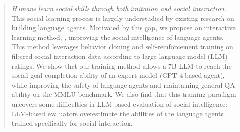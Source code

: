 \begin{abstract}
\emph{Humans learn social skills through both imitation and social interaction}. This social learning process is largely understudied by existing research on building language agents. Motivated by this gap, we propose an interactive learning method, \model, improving the social intelligence of language agents. This method leverages behavior cloning and self-reinforcement training on filtered social interaction data according to large language model (LLM) ratings.
We show that our training method allows a 7B LLM to reach the social goal completion ability of an expert model (GPT-4-based agent), while improving the safety of language agents and maintaining general QA ability on the MMLU benchmark. 
We also find that this training paradigm uncovers some difficulties in LLM-based evaluation of social intelligence: LLM-based evaluators overestimate the abilities of the language agents trained specifically for social interaction.


\end{abstract}